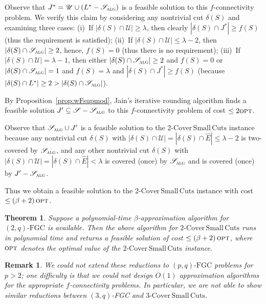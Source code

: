 \documentclass[11pt]{article}
\newtheorem{theorem}{Theorem}
\newtheorem*{remark}{Remark}
\newcommand{\opt}{\textsc{opt}}
\newcommand{\safe}{\mathscr{S}}
\newcommand{\unsafe}{\mathscr{U}}
\newcommand{\fgc}{\mathrm{FGC}}
\newcommand{\pqfgc}{(p,q)\text{-}\fgc}
\newcommand{\J}{{J}}
\newcommand{\alg}{\textsc{alg}}
\newcommand{\twoqfgc}{(2,q)\text{-}\fgc}
\newcommand\capbound{\lambda}
\newcommand\hE{\hat{E}}
\newcommand\twoASC{\mathrm{2\text{-}Cover\,Small\,Cuts}}
\newcommand\threeASC{\mathrm{3\text{-}Cover\,Small\,Cuts}}
\begin{document}
{{Observe that $J^* = \unsafe \cup (L^* - \safe_{\alg})$
is a feasible solution to this $f$-connectivity problem.
We verify this claim by considering any nontrivial cut $\delta(S)$ and
examining three cases:
(i)~If $|\delta(S)\cap\unsafe| \geq \capbound$, then clearly
$|\delta(S)\cap{J^*}|\geq f(S)$ (thus the requirement is satisfied);
(ii)~If $|\delta(S)\cap\unsafe| \leq \capbound-2$, then
$|\delta(S)\cap\safe_{\alg}|\geq2$, hence, $f(S)=0$ (thus there is no requirement);
(iii)~If $|\delta(S)\cap\unsafe| = \capbound-1$, then
either $|\delta(S)\cap\safe_{\alg}|\geq2$ and $f(S)=0$
or $|\delta(S)\cap\safe_{\alg}|=1$ and $f(S)=\capbound$
and $|\delta(S)\cap{J^*}|\geq f(S)$
(because $|\delta(S)\cap{L^*}|\geq2>|\delta(S)\cap\safe_{\alg}|$).


By Proposition~\ref{prop:wFsupmod}, Jain's iterative rounding
algorithm finds a feasible solution $\J'\subseteq{\safe-\safe_{\alg}}$
to this $f$-connectivity problem of cost $\leq 2\opt$.

Observe that $\safe_{\alg}\cup{\J'}$ is a feasible solution to the
$\twoASC$ instance because
any nontrivial cut $\delta(S)$ with
$|\delta(S)\cap\unsafe|=|\delta(S)\cap\hE|\leq\capbound-2$ is
two-covered by $\safe_{\alg}$, and any other nontrivial cut $\delta(S)$
with $|\delta(S)\cap\unsafe|=|\delta(S)\cap\hE|<\capbound$ is covered
(once) by $\safe_{\alg}$ and is covered (once) by $\J'-\safe_{\alg}$.

Thus we obtain a feasible solution to the $\twoASC$ instance with
cost $\leq(\beta+2)\, \opt$.


\begin{theorem} \label{thm:approx-twoASC}
Suppose a polynomial-time $\beta$-approximation algorithm
for $\twoqfgc$ is available.
Then the above algorithm for $\twoASC$ runs in polynomial time and
returns a feasible solution of cost $\leq (\beta+2)\, \opt$,
where $\opt$ denotes the optimal value of the $\twoASC$ instance.
\end{theorem}

\begin{remark}
We could not extend these reductions to $\pqfgc$ problems for $p>2$;
one difficulty is that we could not design $O(1)$ approximation algorithms for the appropriate $f$-connectivity problems.
In particular, we are not able to show similar reductions between $(3,q)$-FGC and $\threeASC$.
\end{remark}
}
}
\end{document}
